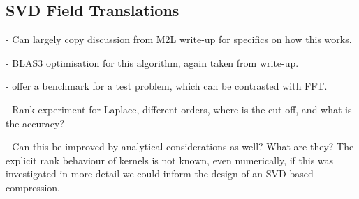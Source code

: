 \subsection{SVD Field Translations}

- Can largely copy discussion from M2L write-up for specifics on how this works.

- BLAS3 optimisation for this algorithm, again taken from write-up.

- offer a benchmark for a test problem, which can be contrasted with FFT.

- Rank experiment for Laplace, different orders, where is the cut-off, and what is the accuracy?

- Can this be improved by analytical considerations as well? What are they? The explicit rank behaviour of kernels is not known, even numerically, if this was investigated in more detail we could inform the design of an SVD based compression.

